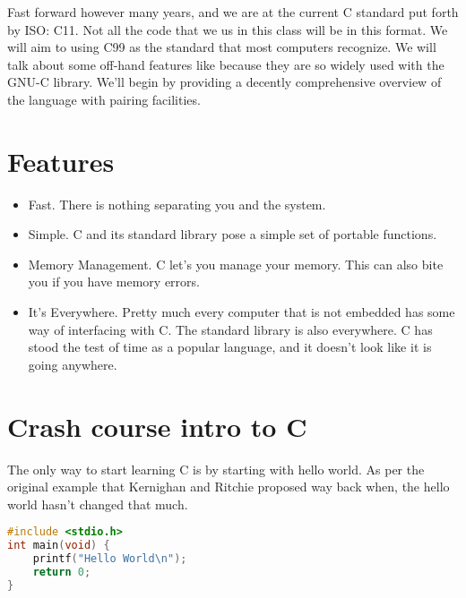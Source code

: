 Fast forward however many years, and we are at the current C standard put forth by ISO: C11. Not all the code that we us in this class will be in this format. We will aim to using C99 as the standard that most computers recognize. We will talk about some off-hand features like  because they are so widely used with the GNU-C library. We'll begin by providing a decently comprehensive overview of the language with pairing facilities.

\section{Features}

\begin{itemize}
	\item Fast. There is nothing separating you and the system.
	\item Simple. C and its standard library pose a simple set of portable functions.
	\item Memory Management. C let's you manage your memory. This can also bite you if you have memory errors.
	\item It's Everywhere. Pretty much every computer that is not embedded has some way of interfacing with C. The standard library is also everywhere. C has stood the test of time as a popular language, and it doesn't look like it is going anywhere.
\end{itemize}

\section{Crash course intro to C}

The only way to start learning C is by starting with hello world. As per the original example that Kernighan and Ritchie proposed way back when, the hello world hasn't changed that much.

\begin{lstlisting}[language=C]
#include <stdio.h>
int main(void) { 
    printf("Hello World\n");
    return 0; 
}
\end{lstlisting}

